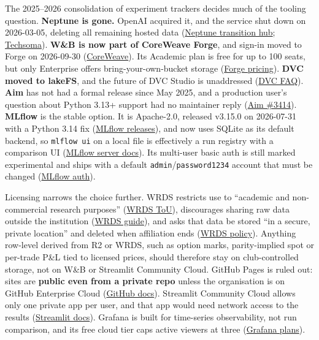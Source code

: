 \documentclass{article}
\begin{document}
The 2025--2026 consolidation of experiment trackers decides much of the tooling question. \textbf{Neptune is gone.} OpenAI acquired it, and the service shut down on 2026-03-05, deleting all remaining hosted data (\href{https://docs.neptune.ai/transition_hub}{Neptune transition hub}; \href{https://techsoma.ca/openai-neptune-acquisition-shutdown/}{Techsoma}). \textbf{W\&B is now part of CoreWeave Forge}, and sign-in moved to Forge on 2026-09-30 (\href{https://www.coreweave.com/companies/weights-and-biases}{CoreWeave}). Its Academic plan is free for up to 100 seats, but only Enterprise offers bring-your-own-bucket storage (\href{https://coreweave.com/forge-pricing}{Forge pricing}). \textbf{DVC moved to lakeFS}, and the future of DVC Studio is unaddressed (\href{https://dvc.org/blog/dvc-joins-lakefs-your-questions-answered/}{DVC FAQ}). \textbf{Aim} has not had a formal release since May 2025, and a production user's question about Python 3.13+ support had no maintainer reply (\href{https://github.com/aimhubio/aim/issues/3414}{Aim \#3414}). \textbf{MLflow} is the stable option. It is Apache-2.0, released v3.15.0 on 2026-07-31 with a Python 3.14 fix (\href{https://mlflow.org/releases/}{MLflow releases}), and now uses SQLite as its default backend, so \texttt{mlflow ui} on a local file is effectively a run registry with a comparison UI (\href{https://mlflow.org/docs/latest/self-hosting/architecture/tracking-server/}{MLflow server docs}). Its multi-user basic auth is still marked experimental and ships with a default \texttt{admin}/\allowbreak{}\texttt{password1234} account that must be changed (\href{https://mlflow.org/docs/latest/self-hosting/security/basic-http-auth/}{MLflow auth}).

Licensing narrows the choice further. WRDS restricts use to ``academic and non-commercial research purposes'' (\href{https://wrds-www.wharton.upenn.edu/users/tou/}{WRDS ToU}), discourages sharing raw data outside the institution (\href{https://wrds-www.wharton.upenn.edu/pages/about/navigating-co-authorship-across-institutions-a-guide-to-data-sharing-and-compliance/}{WRDS guide}), and asks that data be stored ``in a secure, private location'' and deleted when affiliation ends (\href{https://wrds-www.wharton.upenn.edu/pages/about/data-download-and-analysis-policy/}{WRDS policy}). Anything row-level derived from R2 or WRDS, such as option marks, parity-implied spot or per-trade P\&L tied to licensed prices, should therefore stay on club-controlled storage, not on W\&B or Streamlit Community Cloud. GitHub Pages is ruled out: sites are \textbf{public even from a private repo} unless the organisation is on GitHub Enterprise Cloud (\href{https://docs.github.com/en/enterprise-cloud@latest/pages/getting-started-with-github-pages/changing-the-visibility-of-your-github-pages-site}{GitHub docs}). Streamlit Community Cloud allows only one private app per user, and that app would need network access to the results (\href{https://docs.streamlit.io/deploy/streamlit-community-cloud/share-your-app}{Streamlit docs}). Grafana is built for time-series observability, not run comparison, and its free cloud tier caps active viewers at three (\href{https://grafana.com/docs/grafana-cloud/platform/pricing-and-usage/stack-plans/}{Grafana plans}).
\end{document}
